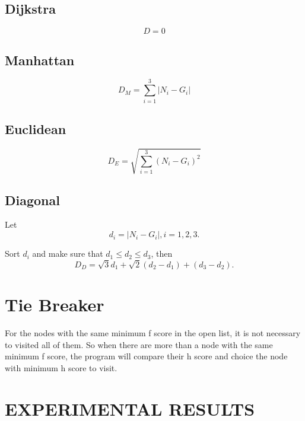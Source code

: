 \documentclass[conference]{IEEEtran}
\begin{document}
\subsection{Dijkstra}
\begin{equation}
D=0  \label{H1}
\end{equation}

\subsection{Manhattan}
\begin{equation}
D_{M}=\sum_{i=1}^{3}{|N_i-G_i|}  \label{H2}
\end{equation}


\subsection{Euclidean}
\begin{equation}
D_{E}=\sqrt{\sum_{i=1}^{3}{(N_i-G_i)^2}} \label{H3}
\end{equation}

\subsection{Diagonal}
Let
\begin{equation*}
d_i=|N_i-G_i|, i=1,2,3.
\end{equation*}

Sort $ d_i $ and make sure that $ d_1 \leq d_2 \leq d_3 $, then
\begin{equation}
D_{D}=\sqrt{3}d_1+\sqrt{2}(d_2-d_1)+(d_3-d_2).   \label{H4}
\end{equation}

\section{Tie Breaker}
For the nodes with the same minimum f score in the open list, it is not necessary to visited all of them. So when there are more than a node with the same minimum f score, the program will compare their h score and choice the node with minimum h score to visit.


\section{EXPERIMENTAL RESULTS}
\end{document}
